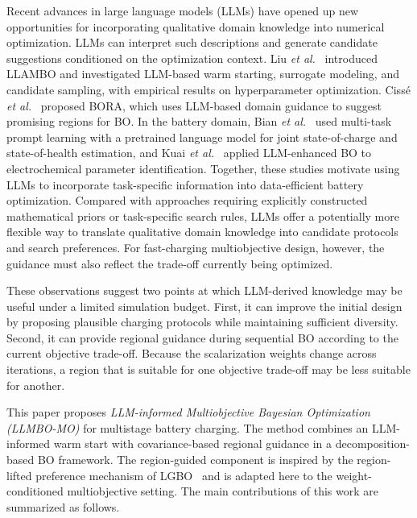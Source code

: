 \documentclass[lettersize,journal]{IEEEtran}
\begin{document}
Recent advances in large language models (LLMs) have opened up new
opportunities for incorporating qualitative domain knowledge into numerical
optimization. LLMs can interpret such descriptions and generate candidate
suggestions conditioned on the optimization context. Liu \emph{et al.}~\cite{nref12}
introduced LLAMBO and investigated LLM-based warm starting, surrogate modeling,
and candidate sampling, with empirical results on hyperparameter optimization.
Ciss\'e \emph{et al.}~\cite{refBORA} proposed BORA, which uses LLM-based domain
guidance to suggest promising regions for BO. In the battery domain,
Bian \emph{et al.}~\cite{refBianLLM} used multi-task prompt learning with a
pretrained language model for joint state-of-charge and state-of-health estimation,
and Kuai \emph{et al.}~\cite{refKuaiLLMBO} applied LLM-enhanced BO to
electrochemical parameter identification. Together, these studies motivate
using LLMs to incorporate task-specific information into data-efficient battery
optimization. Compared with approaches requiring explicitly constructed
mathematical priors or task-specific search rules, LLMs offer a potentially
more flexible way to translate qualitative domain knowledge into candidate
protocols and search preferences. For fast-charging multiobjective design,
however, the guidance must also reflect the trade-off currently being
optimized.

These observations suggest two points at which LLM-derived knowledge may be
useful under a limited simulation budget. First, it can improve the initial
design by proposing plausible charging protocols while maintaining sufficient
diversity. Second, it can provide regional guidance during sequential BO
according to the current objective trade-off. Because the scalarization weights
change across iterations, a region that is suitable for one objective trade-off
may be less suitable for another.

This paper proposes \emph{LLM-informed Multiobjective Bayesian Optimization
(LLMBO-MO)} for multistage battery charging. The method combines an
LLM-informed warm start with covariance-based regional guidance in a
decomposition-based BO framework. The region-guided component is inspired by
the region-lifted preference mechanism of LGBO~\cite{ref5} and is adapted
here to the weight-conditioned multiobjective setting. The main contributions
of this work are summarized as follows.
\end{document}
